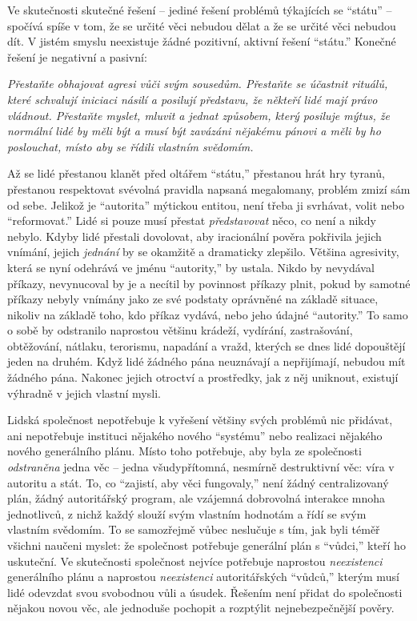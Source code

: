\documentclass{book}
\begin{document}
Ve skutečnosti skutečné řešení -- jediné řešení problémů týkajících se \enquote{státu} -- spočívá spíše v tom, že se určité věci nebudou dělat a že se určité věci nebudou dít. V jistém smyslu neexistuje žádné pozitivní, aktivní řešení \enquote{státu.} Konečné řešení je negativní a pasivní:

\emph{Přestaňte obhajovat agresi vůči svým sousedům. Přestaňte se účastnit rituálů, které schvalují iniciaci násilí a posilují představu, že někteří lidé mají právo vládnout. Přestaňte myslet, mluvit a jednat způsobem, který posiluje mýtus, že normální lidé by měli být a musí být zavázáni nějakému pánovi a měli by ho poslouchat, místo aby se řídili vlastním svědomím.}

Až se lidé přestanou klanět před oltářem \enquote{státu,} přestanou hrát hry tyranů, přestanou respektovat svévolná pravidla napsaná megalomany, problém zmizí sám od sebe. Jelikož je \enquote{autorita} mýtickou entitou, není třeba ji svrhávat, volit nebo \enquote{reformovat.} Lidé si pouze musí přestat \emph{představovat} něco, co není a nikdy nebylo. Kdyby lidé přestali dovolovat, aby iracionální pověra pokřivila jejich vnímání, jejich \emph{jednání} by se okamžitě a dramaticky zlepšilo. Většina agresivity, která se nyní odehrává ve jménu \enquote{autority,} by ustala. Nikdo by nevydával příkazy, nevynucoval by je a necítil by povinnost příkazy plnit, pokud by samotné příkazy nebyly vnímány jako ze své podstaty oprávněné na základě situace, nikoliv na základě toho, kdo příkaz vydává, nebo jeho údajné \enquote{autority.} To samo o sobě by odstranilo naprostou většinu krádeží, vydírání, zastrašování, obtěžování, nátlaku, terorismu, napadání a vražd, kterých se dnes lidé dopouštějí jeden na druhém. Když lidé žádného pána neuznávají a nepřijímají, nebudou mít žádného pána. Nakonec jejich otroctví a prostředky, jak z něj uniknout, existují výhradně v jejich vlastní mysli.

Lidská společnost nepotřebuje k vyřešení většiny svých problémů nic přidávat, ani nepotřebuje instituci nějakého nového \enquote{systému} nebo realizaci nějakého nového generálního plánu. Místo toho potřebuje, aby byla ze společnosti \emph{odstraněna} jedna věc -- jedna všudypřítomná, nesmírně destruktivní věc: víra v autoritu a stát. To, co \enquote{zajistí, aby věci fungovaly,} není žádný centralizovaný plán, žádný autoritářský program, ale vzájemná dobrovolná interakce mnoha jednotlivců, z nichž každý slouží svým vlastním hodnotám a řídí se svým vlastním svědomím. To se samozřejmě vůbec neslučuje s tím, jak byli téměř všichni naučeni myslet: že společnost potřebuje generální plán s \enquote{vůdci,} kteří ho uskuteční. Ve skutečnosti společnost nejvíce potřebuje naprostou \emph{neexistenci} generálního plánu a naprostou \emph{neexistenci} autoritářských \enquote{vůdců,} kterým musí lidé odevzdat svou svobodnou vůli a úsudek. Řešením není přidat do společnosti nějakou novou věc, ale jednoduše pochopit a rozptýlit nejnebezpečnější pověry.
\end{document}
